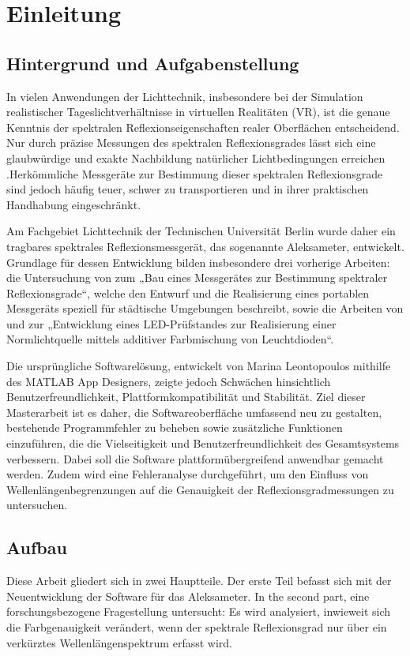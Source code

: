 \chapter{Einleitung}
\section{Hintergrund und Aufgabenstellung}
In vielen Anwendungen der Lichttechnik, insbesondere bei der Simulation realistischer Tageslichtverhältnisse in virtuellen Realitäten (VR), ist die genaue Kenntnis der spektralen Reflexionseigenschaften realer Oberflächen entscheidend. Nur durch präzise Messungen des spektralen Reflexionsgrades lässt sich eine glaubwürdige und exakte Nachbildung natürlicher Lichtbedingungen erreichen \parencite{Scorpio2022}.Herkömmliche Messgeräte zur Bestimmung dieser spektralen Reflexionsgrade sind jedoch häufig teuer, schwer zu transportieren und in ihrer praktischen Handhabung eingeschränkt.

Am Fachgebiet Lichttechnik der Technischen Universität Berlin wurde daher ein tragbares spektrales Reflexionsmessgerät, das sogenannte Aleksameter, entwickelt. Grundlage für dessen Entwicklung bilden insbesondere drei vorherige Arbeiten: die Untersuchung von \textcite{Piotrowska2022} zum „Bau eines Messgerätes zur Bestimmung spektraler Reflexionsgrade“, welche den Entwurf und die Realisierung eines portablen Messgeräts speziell für städtische Umgebungen beschreibt, sowie die Arbeiten von \textcite{SchaaleSegeroth2022} und \textcite{Kaczmarek2022} zur „Entwicklung eines LED-Prüfstandes zur Realisierung einer Normlichtquelle mittels additiver Farbmischung von Leuchtdioden“.

Die ursprüngliche Softwarelösung, entwickelt von Marina Leontopoulos mithilfe des MATLAB App Designers, zeigte jedoch Schwächen hinsichtlich Benutzerfreundlichkeit, Plattformkompatibilität und Stabilität. Ziel dieser Masterarbeit ist es daher, die Softwareoberfläche umfassend neu zu gestalten, bestehende Programmfehler zu beheben sowie zusätzliche Funktionen einzuführen, die die Vielseitigkeit und Benutzerfreundlichkeit des Gesamtsystems verbessern. Dabei soll die Software plattformübergreifend anwendbar gemacht werden. Zudem wird eine Fehleranalyse durchgeführt, um den Einfluss von Wellenlängenbegrenzungen auf die Genauigkeit der Reflexionsgradmessungen zu untersuchen.

\section{Aufbau}
Diese Arbeit gliedert sich in zwei Hauptteile. Der erste Teil befasst sich mit der Neuentwicklung der Software für das Aleksameter. In the second part, eine forschungsbezogene Fragestellung untersucht: Es wird analysiert, inwieweit sich die Farbgenauigkeit verändert, wenn der spektrale Reflexionsgrad nur über ein verkürztes Wellenlängenspektrum erfasst wird.

